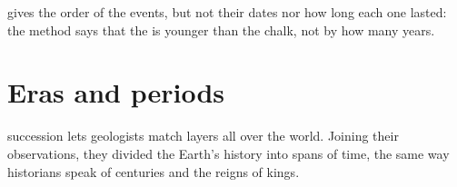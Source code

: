  gives the order of the events, but not their dates nor
how long each one lasted: the method says that the  is younger than
the chalk, not by how many years.

\section{Eras and periods}

 succession lets geologists match layers all over the world.
Joining their observations, they divided the Earth's history into spans
of time, the same way historians speak of centuries and the reigns of
kings.

